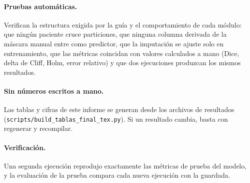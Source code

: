 \paragraph{Pruebas automáticas.} Verifican la estructura exigida por la guía y el
comportamiento de cada módulo: que ningún paciente cruce particiones, que ninguna
columna derivada de la máscara manual entre como predictor, que la imputación se
ajuste solo en entrenamiento, que las métricas coincidan con valores calculados a
mano (Dice, delta de Cliff, Holm, error relativo) y que dos ejecuciones produzcan
los mismos resultados.

\paragraph{Sin números escritos a mano.} Las tablas y cifras de este informe se
generan desde los archivos de resultados (\texttt{scripts/build\_tablas\_final\_tex.py}).
Si un resultado cambia, basta con regenerar y recompilar.

\paragraph{Verificación.} Una segunda ejecución reprodujo exactamente las métricas
de prueba del modelo, y la evaluación de la prueba compara cada nueva ejecución con
la guardada.
